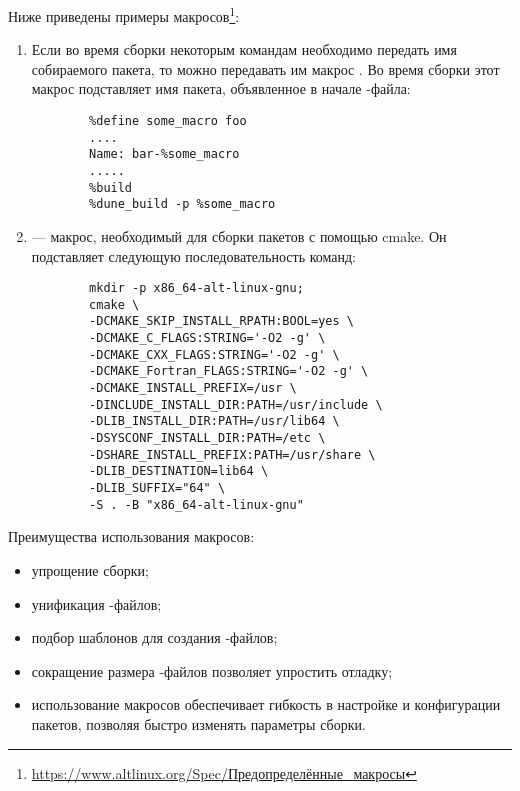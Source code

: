 Ниже приведены примеры макросов\footnote{\href{https://www.altlinux.org/Spec/\%D0\%9F\%D1\%80\%D0\%B5\%D0\%B4\%D0\%BE\%D0\%BF\%D1\%80\%D0\%B5\%D0\%B4\%D0\%B5\%D0\%BB\%D0\%B5\%D0\%BD\%D0\%BD\%D1\%8B\%D0\%B5_\%D0\%BC\%D0\%B0\%D0\%BA\%D1\%80\%D0\%BE\%D1\%81\%D1\%8B}{https://www.altlinux.org/Spec/Предопределённые\_макросы}}:
\begin{enumerate}
	\item {}
		Если во время сборки некоторым командам необходимо передать имя собираемого пакета,
		то можно передавать им макрос . Во время сборки этот макрос подставляет
		имя пакета, объявленное в начале -файла:
\begin{verbatim}
        %define some_macro foo
        ....
        Name: bar-%some_macro
        .....
        %build
        %dune_build -p %some_macro
\end{verbatim}
	
	\item {}
	 --- макрос, необходимый для сборки пакетов с помощью cmake.
		Он подставляет следующую последовательность команд:
\begin{verbatim}
        mkdir -p x86_64-alt-linux-gnu;
        cmake \
        -DCMAKE_SKIP_INSTALL_RPATH:BOOL=yes \
        -DCMAKE_C_FLAGS:STRING='-O2 -g' \
        -DCMAKE_CXX_FLAGS:STRING='-O2 -g' \
        -DCMAKE_Fortran_FLAGS:STRING='-O2 -g' \
        -DCMAKE_INSTALL_PREFIX=/usr \
        -DINCLUDE_INSTALL_DIR:PATH=/usr/include \
        -DLIB_INSTALL_DIR:PATH=/usr/lib64 \
        -DSYSCONF_INSTALL_DIR:PATH=/etc \
        -DSHARE_INSTALL_PREFIX:PATH=/usr/share \
        -DLIB_DESTINATION=lib64 \
        -DLIB_SUFFIX="64" \
        -S . -B "x86_64-alt-linux-gnu"
\end{verbatim}
\end{enumerate}

Преимущества использования макросов:
\begin{itemize}
	\item упрощение сборки;
	\item унификация -файлов;
	\item подбор шаблонов для создания \Sys{SPEC}-файлов;
	\item сокращение размера \Sys{SPEC}-файлов позволяет упростить отладку;
	\item использование макросов обеспечивает гибкость в настройке и конфигурации
		пакетов, позволяя быстро изменять параметры сборки.
\end{itemize}


